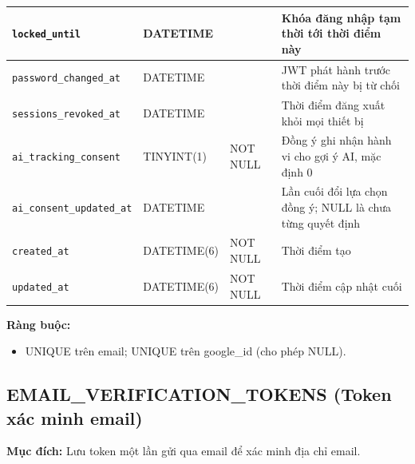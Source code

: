 {\begin{longtable}{|P{3.2cm}|P{2.8cm}|P{2.2cm}|p{5.4cm}|}
    \hline
    \texttt{locked\_\allowbreak{}until} & DATETIME &  & Khóa đăng nhập tạm thời tới thời điểm này \\
    \hline
    \texttt{password\_\allowbreak{}changed\_\allowbreak{}at} & DATETIME &  & JWT phát hành trước thời điểm này bị từ chối \\
    \hline
    \texttt{sessions\_\allowbreak{}revoked\_\allowbreak{}at} & DATETIME &  & Thời điểm đăng xuất khỏi mọi thiết bị \\
    \hline
    \texttt{ai\_\allowbreak{}tracking\_\allowbreak{}consent} & TINYINT(1) & NOT NULL & Đồng ý ghi nhận hành vi cho gợi ý AI, mặc định 0 \\
    \hline
    \texttt{ai\_\allowbreak{}consent\_\allowbreak{}updated\_\allowbreak{}at} & DATETIME &  & Lần cuối đổi lựa chọn đồng ý; NULL là chưa từng quyết định \\
    \hline
    \texttt{created\_\allowbreak{}at} & DATETIME(6) & NOT NULL & Thời điểm tạo \\
    \hline
    \texttt{updated\_\allowbreak{}at} & DATETIME(6) & NOT NULL & Thời điểm cập nhật cuối \\
    \hline
\end{longtable}
}

\textbf{Ràng buộc:}
\begin{itemize}
    \item UNIQUE trên email; UNIQUE trên google\_\allowbreak{}id (cho phép NULL).
\end{itemize}

\subsection{EMAIL\_\allowbreak{}VERIFICATION\_\allowbreak{}TOKENS (Token xác minh email)}

\textbf{Mục đích:} Lưu token một lần gửi qua email để xác minh địa chỉ email.


